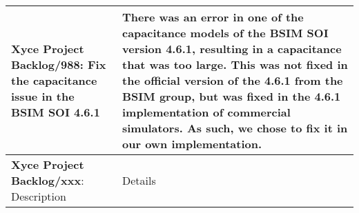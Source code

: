 {\begin{longtable}[h] {>{\raggedright\small}m{2in}|>{\raggedright\let\\\tabularnewline\small}m{3.5in}}
  \textbf{Xyce Project Backlog/988}: Fix the capacitance issue in the BSIM SOI 4.6.1 &  There was an error in one of the capacitance models of the BSIM SOI version 4.6.1, resulting in a capacitance that was too large.  This was not fixed in the official version of the 4.6.1 from the BSIM group, but was fixed in the 4.6.1 implementation of commercial simulators.  As such, we chose to fix it in our own implementation. 
  \\\hline

\textbf{Xyce Project Backlog/xxx}: Description
  &  Details
  \\\hline


\end{longtable}
}
